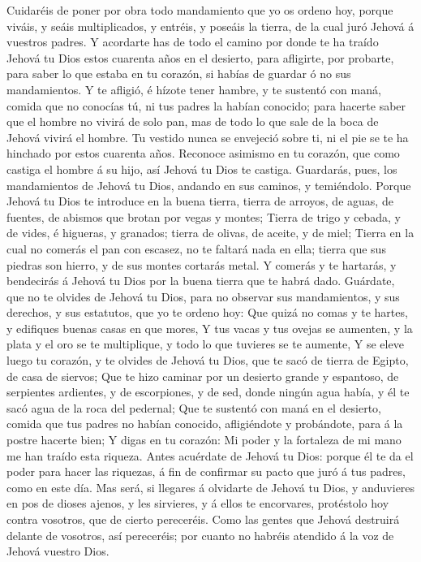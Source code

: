  Cuidaréis de poner por obra todo mandamiento que yo os
ordeno hoy, porque viváis, y seáis multiplicados, y entréis, y poseáis
la tierra, de la cual juró Jehová á vuestros padres.  Y
acordarte has de todo el camino por donde te ha traído Jehová tu Dios
estos cuarenta años en el desierto, para afligirte, por probarte, para
saber lo que estaba en tu corazón, si habías de guardar ó no sus
mandamientos.  Y te afligió, é hízote tener hambre, y te
sustentó con maná, comida que no conocías tú, ni tus padres la habían
conocido; para hacerte saber que el hombre no vivirá de solo pan, mas de
todo lo que sale de la boca de Jehová vivirá el hombre.  Tu
vestido nunca se envejeció sobre ti, ni el pie se te ha hinchado por
estos cuarenta años.  Reconoce asimismo en tu corazón, que
como castiga el hombre á su hijo, así Jehová tu Dios te castiga.
 Guardarás, pues, los mandamientos de Jehová tu Dios,
andando en sus caminos, y temiéndolo.  Porque Jehová tu Dios
te introduce en la buena tierra, tierra de arroyos, de aguas, de
fuentes, de abismos que brotan por vegas y montes;  Tierra
de trigo y cebada, y de vides, é higueras, y granados; tierra de olivas,
de aceite, y de miel;  Tierra en la cual no comerás el pan
con escasez, no te faltará nada en ella; tierra que sus piedras son
hierro, y de sus montes cortarás metal.  Y comerás y te
hartarás, y bendecirás á Jehová tu Dios por la buena tierra que te habrá
dado.  Guárdate, que no te olvides de Jehová tu Dios, para
no observar sus mandamientos, y sus derechos, y sus estatutos, que yo te
ordeno hoy:  Que quizá no comas y te hartes, y edifiques
buenas casas en que mores,  Y tus vacas y tus ovejas se
aumenten, y la plata y el oro se te multiplique, y todo lo que tuvieres
se te aumente,  Y se eleve luego tu corazón, y te olvides
de Jehová tu Dios, que te sacó de tierra de Egipto, de casa de siervos;
 Que te hizo caminar por un desierto grande y espantoso, de
serpientes ardientes, y de escorpiones, y de sed, donde ningún agua
había, y él te sacó agua de la roca del pedernal;  Que te
sustentó con maná en el desierto, comida que tus padres no habían
conocido, afligiéndote y probándote, para á la postre hacerte bien;
 Y digas en tu corazón: Mi poder y la fortaleza de mi mano
me han traído esta riqueza.  Antes acuérdate de Jehová tu
Dios: porque él te da el poder para hacer las riquezas, á fin de
confirmar su pacto que juró á tus padres, como en este día.
 Mas será, si llegares á olvidarte de Jehová tu Dios, y
anduvieres en pos de dioses ajenos, y les sirvieres, y á ellos te
encorvares, protéstolo hoy contra vosotros, que de cierto pereceréis.
 Como las gentes que Jehová destruirá delante de vosotros,
así pereceréis; por cuanto no habréis atendido á la voz de Jehová
vuestro Dios.


